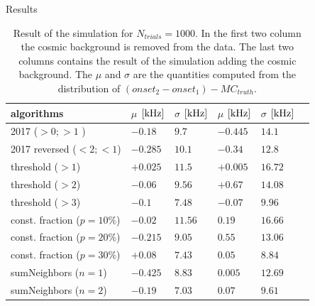 \documentclass[9pt]{beamer}
\begin{document}
\begin{frame}{Results}

\begin{table}
\center
\begin{tabular}{l|l l l l l}
\hline 
algorithms & $\mu$ $\small[\SI{}{\kilo \hertz}]$  & $\sigma$  $\small[\SI{}{\kilo \hertz}]$& $\mu$ $\small[\SI{}{\kilo \hertz}]$ & $\sigma$ $\small[\SI{}{\kilo \hertz}]$ \\ 
\hline
2017 ($ > 0 ; > 1$ )          & $-0.18$  & $9.7$   & $-0.445$ & $14.1$ \\ 

2017 reversed ($ < 2; < 1$)   & $-0.285$ & $10.1$  & $-0.34$  & $12.8$ \\ 

threshold ($ > 1$)            & $+0.025$ & $11.5$  & $+0.005$ & $16.72$ \\ 

threshold ($ > 2$)            & $-0.06$  & $9.56$  & $+0.67$  & $14.08$ \\ 

threshold ($ > 3$)            & $-0.1$   & $7.48$  & $-0.07$  & $9.96$\\

const. fraction ($ p = 10 \% $) & $-0.02$  & $11.56$ & $0.19$   & $16.66$ \\ 
 
const. fraction ($ p = 20 \% $) & $-0.215$ & $9.05$  & $0.55$   & $13.06$ \\ 

const. fraction ($ p = 30 \% $) & $+0.08$  & $7.43$  & $0.05$   & $8.84$ \\

sumNeighbors ($ n = 1 $) & $-0.425$  & $8.83$  & $0.005$   & $12.69$ \\

sumNeighbors ($ n = 2 $) & $-0.19$  & $7.03$  & $0.07$   & $9.61$ \\
\hline
\end{tabular}
\caption{ Result of the simulation for $N_{trials} = 1000$. In the first two column the cosmic background is removed from the data. The last two columns contains the result of the simulation adding the cosmic background. The $\mu$ and $\sigma$ are the quantities computed from the distribution of $(onset_{2} - onset_{1}) - MC_{truth}$.}
\end{table}
\end{frame}
\end{document}
